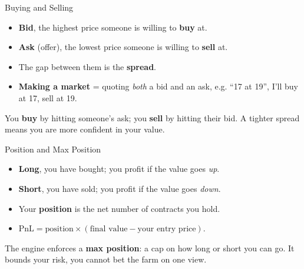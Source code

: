 \begin{frame}{Buying and Selling}
  \begin{itemize}
    \item \textbf{Bid}, the highest price someone is willing to \textbf{buy} at.
    \item \textbf{Ask} (offer), the lowest price someone is willing to \textbf{sell} at.
    \item The gap between them is the \textbf{spread}.
    \item \textbf{Making a market} = quoting \emph{both} a bid and an ask, e.g.
      ``17 at 19'', I'll buy at 17, sell at 19.
  \end{itemize}

  \vspace{0.2cm}
  \begin{sqt:definition}
    You \textbf{buy} by hitting someone's ask; you \textbf{sell} by hitting
    their bid. A tighter spread means you are more confident in your value.
  \end{sqt:definition}
\end{frame}

\begin{frame}{Position and Max Position}
  \begin{itemize}
    \item \textbf{Long}, you have bought; you profit if the value goes \emph{up}.
    \item \textbf{Short}, you have sold; you profit if the value goes \emph{down}.
    \item Your \textbf{position} is the net number of contracts you hold.
    \item $\text{PnL} = \text{position} \times (\text{final value} - \text{your entry price})$.
  \end{itemize}

  \vspace{0.2cm}
  \begin{sqt:definition}
    The engine enforces a \textbf{max position}: a cap on how long or short you
    can go. It bounds your risk, you cannot bet the farm on one view.
  \end{sqt:definition}
\end{frame}

